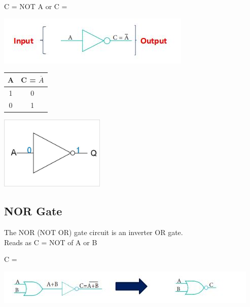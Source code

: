 \documentclass[10pt,a4paper,onecolumn]{article}
\begin{document}
\color{red}C = NOT A or C = \\ \color{black}
\begin{center}\includegraphics{gst10}\end{center}
\begin{table}[h!]
	\begin{center}
		\begin{tabular}{c|c}
			\textbf{A} & 
			\textbf{C = $\overline{A}$}\\
			\hline
			1 & 0 \\
			\hline
			0 & 1 \\
			\hline
		\end{tabular}
	\end{center}
\end{table} 
\begin{center}\includegraphics[width=5cm]{gst12}\end{center}

\subsection{NOR Gate}
The NOR (NOT OR) gate circuit is an inverter OR gate. \\

\color{red}Reads as C = NOT of A or B \\ \color{black}

C = \begin{center}\includegraphics{gst13}\end{center}
\end{document}
